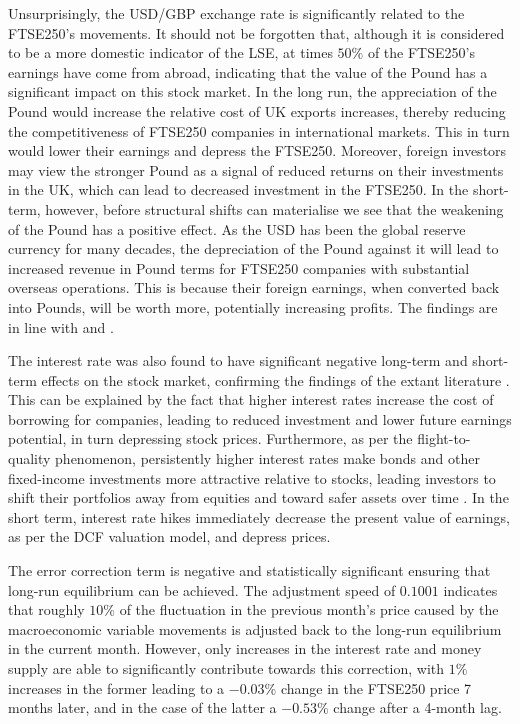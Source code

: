 \documentclass[11pt,a4paper]{article}
\newcommand{\citeboth}[1]{\citeauthor{#1} \citep{#1}}
\begin{document}
Unsurprisingly, the USD/GBP exchange rate is significantly related to the FTSE250's movements. It 
should not be forgotten that, although it is considered to be a more domestic indicator of the LSE, 
at times $50\%$ of the FTSE250's earnings have come from abroad, indicating that 
the value of the Pound has a significant impact on this stock market. 
In the long run, the appreciation of the Pound would increase the relative 
cost of UK exports increases, thereby reducing the 
competitiveness of FTSE250 companies in international markets. This in turn would lower their earnings
and depress the FTSE250. Moreover, foreign investors may view the stronger Pound as a signal of reduced returns on their investments in the UK, which can lead to decreased investment in the FTSE250. 
In the short-term, however, before structural shifts can materialise we see that the
weakening of the Pound has a positive effect. As the USD has been 
the global reserve currency for many decades, the depreciation of the Pound 
against it will lead to increased revenue in Pound terms for FTSE250 companies with substantial overseas operations. This is because their foreign earnings, when converted back into Pounds, will be worth more, potentially increasing profits. The findings 
are in line with \citeboth{neifar2023} and \citeboth{khan2018}.

The interest rate was also found to have significant negative long-term and short-term effects on the stock market, confirming the findings of the extant literature \citep{alam2009,demir2019,neifar2023, talla2013}. 
This can be explained by the fact that higher interest 
rates increase the cost of borrowing for companies, leading to reduced investment 
and lower future earnings potential, in turn depressing stock prices. 
Furthermore, as per the flight-to-quality phenomenon, persistently higher interest rates make bonds and other fixed-income 
investments more attractive relative to stocks, leading investors to shift 
their portfolios away from equities and toward safer assets over time \citep{asgharian2016}. 
In the short term, interest rate hikes immediately decrease the present value of earnings, as per the 
DCF valuation model, and depress prices.

The error correction term 
is negative and statistically significant ensuring that long-run equilibrium 
can be achieved. The adjustment speed of $0.1001$ indicates that 
roughly $10\%$ of the fluctuation in the previous month's price caused by the 
macroeconomic variable movements is adjusted back to the long-run equilibrium in the current month.
However, only increases in the interest rate and money supply are able to 
significantly contribute towards this correction, with $1\%$ increases in the former 
leading to a $-0.03\%$ change in the FTSE250 price 7 months later, and in the case of the latter
a $-0.53\%$ change after a 4-month lag. 
\end{document}
